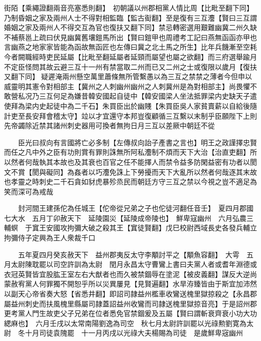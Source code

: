 街陌【乘繩證翻兩音亮塞悉則翻】　初朝議以州郡相黨人情比周【比毗至翻下同】乃制昏姻之家及兩州人士不得對相監臨【監古䘖翻】至是復有三互灋【賢曰三互謂婚姻之家及兩州人不得交互為官也復扶又翻下同】禁忌轉密選用艱難幽冀二州久缺不補蔡邕上疏曰伏見幽冀舊壤鎧馬所出【賢曰鎧甲也周禮考工記曰燕無函函亦甲也言幽燕之地家家皆能為函故無函匠也左傳曰冀之北土馬之所生】比年兵饑漸至空耗今者闕職經時吏民延屬【比毗至翻延屬者延頸而屬望也屬之欲翻】而三府選舉踰月不定臣怪問其故云避三互十一州有禁當取二州而已又二州之士或復限以歲月【復扶又翻下同】疑遲淹兩州懸空萬里蕭條無所管繫愚以為三互之禁禁之薄者今但申以威靈明其憲令對相部主【冀州之人刺幽州幽州之人刺冀州是為對相部主】尚畏懼不敢營私况乃三互何足為嫌昔韓安國起自徒中【韓安國梁人坐法抵罪梁内史缺天子遣使拜為梁内史起徒中為二千石】朱買臣出於幽賤【朱買臣吳人家貧賣薪以自給後隨計吏至長安拜會稽太守】竝以才宜還守本邦豈復顧循三互繫以末制乎臣願陛下上則先帝蠲除近禁其諸州刺史器用可換者無拘日月三互以差厥中朝廷不從

　　臣光曰叔向有言國將亡必多制【左傳叔向詒子產書之言也】明王之政謹擇忠賢而任之凡中外之臣有功則賞有罪則誅無所阿私灋制不煩而天下大治【治直吏翻】所以然者何哉執其本故也及其衰也百官之任不能擇人而禁令益多防閑益密有功者以閡文不賞【閡與礙同】為姦者以巧灋免誅上下勞擾而天下大亂所以然者何哉逐其末故也孝靈之時刺史二千石貪如豺虎暴殄烝民而朝廷方守三互之禁以今視之豈不適足為笑而深可為戒哉

　　封河間王建孫佗為任城王【佗帝從兄弟之子也佗徒河翻任音壬】　夏四月郡國七大水　五月丁卯赦天下　延陵園災【延陵成帝陵也】　鮮卑寇幽州　六月弘農三輔螟　于窴王安國攻拘彌大破之殺其王【窴徒賢翻】戊巳校尉西域長史各發兵輔立拘彌侍子定興為王人衆裁千口

　　五年夏四月癸亥赦天下　益州郡夷反太守李顒討平之【顒魚容翻】　大雩　五月太尉陳耽罷以司空許訓為太尉　閏月永昌太守曹鸞上書曰夫黨人者或耆年淵德或衣冠英賢皆宜股肱王室左右大猷者也而久被禁錮辱在塗泥【被皮義翻】謀反大逆尚蒙赦宥黨人何罪獨不開恕乎所以災異屢見【見賢遍翻】水旱洊臻皆由于斯宜加沛然以副天心帝省奏大怒【省悉井翻】即詔司隷益州檻車收鸞送槐里獄掠殺之【永昌郡屬益州刺史而扶風槐里縣屬司隷蓋詔益州收鸞而司隷送槐里獄掠音亮】于是詔州郡更考黨人門生故吏父子兄弟在位者悉免官禁錮爰及五屬【賢曰謂斬衰齊衰小功大功緦麻也】　六月壬戌以太常南陽劉逸為司空　秋七月太尉許訓罷以光祿勲劉寛為太尉　冬十月司徒袁隗罷　十一月丙戌以光祿大夫楊賜為司徒　是歲鮮卑宼幽州

